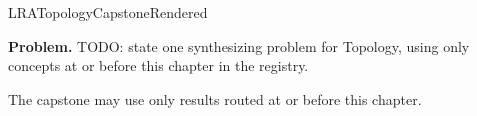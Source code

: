 \ifcsname LRATopologyCapstoneRendered\endcsname
\else
\expandafter\gdef\csname LRATopologyCapstoneRendered\endcsname{}

\newpage
{}
\label{cap:topological-spaces}

\begin{tcolorbox}[
  colback=gray!6,
  colframe=gray!40,
  arc=2pt,
  left=8pt, right=8pt, top=6pt, bottom=6pt,
  title={\small\textbf{Capstone Problem}},
  fonttitle=\small\bfseries
]
\textbf{Problem.}
TODO: state one synthesizing problem for Topology, using only concepts at or
before this chapter in the registry.
\end{tcolorbox}

\begin{remark*}
The capstone may use only results routed at or before this chapter.
\end{remark*}

\clearpage
\fi
